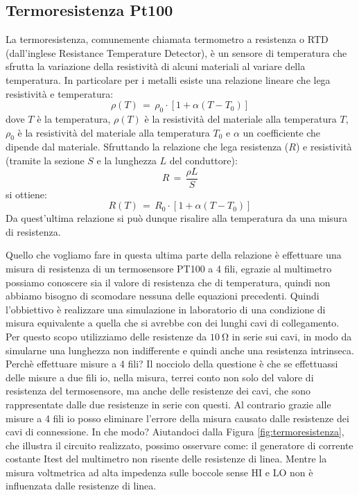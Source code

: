 \subsection*{Termoresistenza Pt100}

La termoresistenza, comunemente chiamata termometro a resistenza o RTD (dall'inglese Resistance Temperature Detector), è un sensore di temperatura che sfrutta la variazione della resistività di alcuni materiali al variare della temperatura. In particolare per i metalli esiste una relazione lineare che lega resistività e temperatura:
\begin{equation}
    \rho (T)\,=\,\rho_0\cdot[1 + \alpha(T - T_0)]
\end{equation}
dove $T$ è la temperatura, $\rho (T)$ è la resistività del materiale alla temperatura $T$, $\rho_0$ è la resistività del materiale alla temperatura $T_0$ e $\alpha$ un coefficiente che dipende dal materiale.
Sfruttando la relazione che lega resistenza ($R$) e resistività (tramite la sezione $S$ e la lunghezza $L$ del conduttore):
\begin{equation}
    R\,=\,\frac{\rho L}{S} 
\end{equation}
si ottiene:
\begin{equation}
    R(T)\,=\,R_0 \cdot [1 + \alpha(T - T_0)]
\end{equation}
Da quest'ultima relazione si può dunque risalire alla temperatura da una misura di resistenza.

Quello che vogliamo fare in questa ultima parte della relazione è effettuare una misura di resistenza di un termosensore PT100 a 4 fili, egrazie al multimetro possiamo conoscere sia il valore di resistenza che di temperatura, quindi non abbiamo bisogno di scomodare nessuna delle equazioni precedenti. Quindi l'obbiettivo è realizzare una simulazione in laboratorio di una condizione di misura equivalente a quella che si avrebbe con dei lunghi cavi di collegamento.
Per questo scopo utilizziamo delle resistenze da $\SI{10}{\ohm}$ in serie sui cavi, in modo da simularne una lunghezza non indifferente e quindi anche una resistenza intrinseca.
Perchè effettuare misure a 4 fili? Il nocciolo della questione è che se effettuassi delle misure a due fili io, nella misura, terrei conto non solo del valore di resistenza del termosensore, ma anche delle resistenze dei cavi, che sono rappresentate dalle due resistenze in serie con questi. Al contrario grazie alle misure a 4 fili io posso eliminare l’errore della misura causato dalle resistenze dei cavi di connessione. In che modo? Aiutandoci dalla Figura \ref{fig:termoresistenza}, che illustra il circuito realizzato, possimo osservare come: il generatore di corrente costante Itest del multimetro non risente delle resistenze di linea. Mentre la misura voltmetrica ad alta impedenza sulle boccole sense HI e LO non è influenzata dalle resistenze di linea.


